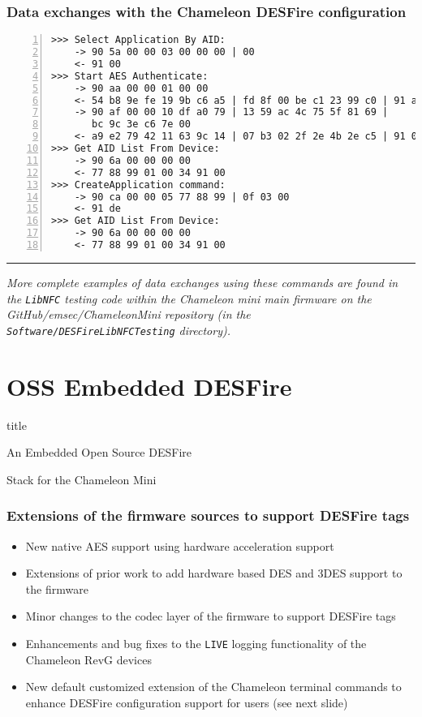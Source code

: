 \documentclass[usenames,svgnames,dvipsnames,11pt]{beamer}
\newcommand{\TitleBoxed}[1]{
     \begin{beamercolorbox}[sep=8pt,center,shadow=true,rounded=true]{title}
          \usebeamerfont{title}#1\par%
     \end{beamercolorbox}
}
\begin{document}
\begin{frame}[fragile]
\frametitle{Data exchanges with the Chameleon DESFire configuration}

\begin{Verbatim}[numbers=left,fontsize=\scriptsize,frame=single]
>>> Select Application By AID:
    -> 90 5a 00 00 03 00 00 00 | 00 
    <- 91 00 
>>> Start AES Authenticate:
    -> 90 aa 00 00 01 00 00 
    <- 54 b8 9e fe 19 9b c6 a5 | fd 8f 00 be c1 23 99 c0 | 91 af 
    -> 90 af 00 00 10 df a0 79 | 13 59 ac 4c 75 5f 81 69 | 
       bc 9c 3e c6 7e 00 
    <- a9 e2 79 42 11 63 9c 14 | 07 b3 02 2f 2e 4b 2e c5 | 91 00 
>>> Get AID List From Device:
    -> 90 6a 00 00 00 00 
    <- 77 88 99 01 00 34 91 00 
>>> CreateApplication command:
    -> 90 ca 00 00 05 77 88 99 | 0f 03 00 
    <- 91 de 
>>> Get AID List From Device:
    -> 90 6a 00 00 00 00 
    <- 77 88 99 01 00 34 91 00 
\end{Verbatim}

\medskip\hrule\medskip
\noindent\it\scriptsize 
More complete examples of data exchanges using these commands are found in the 
\texttt{LibNFC} testing code within the 
Chameleon mini main firmware on the \textit{GitHub/emsec/ChameleonMini} repository 
(in the \texttt{Software/DESFireLibNFCTesting} directory). 

\end{frame}

\section{OSS Embedded DESFire}

\begin{frame}
\TitleBoxed{
     \huge{\centerline{An Embedded Open Source DESFire}}
     \huge{\centerline{Stack for the Chameleon Mini}}
}
\end{frame}

\begin{frame}
\frametitle{Extensions of the firmware sources to support DESFire tags}

\begin{itemize}
\item New native AES support using hardware acceleration support
\item Extensions of prior work to add hardware based DES and 3DES support to the firmware 
\item Minor changes to the codec layer of the firmware to support DESFire tags 
\item Enhancements and bug fixes to the \texttt{LIVE} logging functionality of the 
      Chameleon RevG devices 
\item New default customized extension of the Chameleon terminal commands to 
      enhance DESFire configuration support for users (see next slide)
\end{itemize}

\end{frame}
\end{document}
